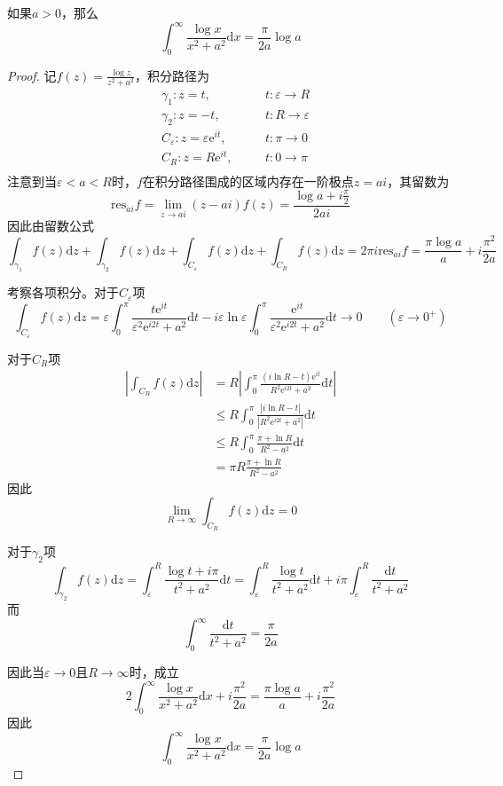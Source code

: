 \documentclass[lang = cn, scheme = chinese, thmcnt = section]{elegantbook}
\begin{document}
\begin{proposition}
	如果$a>0$，那么
	$$
	\int_0^\infty \frac{\log x}{x^2+a^2}\mathrm{d}x=\frac{\pi}{2a}\log a
	$$
\end{proposition}

\begin{proof}
	记$f(z)=\frac{\log z}{z^2+a^2}$​，积分路径为
	\begin{align*}
		&\gamma_1:z=t,\quad &&t:\varepsilon\to R\\
		&\gamma_2:z=-t,\quad &&t:R\to \varepsilon\\
		&C_\varepsilon:z=\varepsilon\mathrm{e}^{it},\quad &&t:\pi\to 0\\
		&C_R:z=R\mathrm{e}^{it},\quad &&t:0\to \pi\\
	\end{align*}
	注意到当$\varepsilon< a <R$时，$f$在积分路径围成的区域内存在一阶极点$z=ai$，其留数为
	$$
	\mathrm{res}_{ai}f=\lim_{z\to ai}(z-ai)f(z)=\frac{\log a+i\frac{\pi}{2}}{2ai}
	$$
	因此由留数公式
	$$
	\int_{\gamma_1}f(z)\mathrm{d}z+\int_{\gamma_2}f(z)\mathrm{d}z+\int_{C_\varepsilon}f(z)\mathrm{d}z+\int_{C_R}f(z)\mathrm{d}z=2\pi i\mathrm{res}_{ai}f=\frac{\pi\log a}{a}+i\frac{\pi^2}{2a}
	$$
	
	考察各项积分。对于$C_\varepsilon$项
	$$
	\int_{C_\varepsilon}f(z)\mathrm{d}z
	=\varepsilon\int_0^\pi\frac{t\mathrm{e}^{it}}{\varepsilon^2\mathrm{e}^{i2t}+a^2}\mathrm{d}t
	-i\varepsilon\ln\varepsilon\int_0^\pi \frac{\mathrm{e}^{it}}{\varepsilon^2\mathrm{e}^{i2t}+a^2}\mathrm{d}t\to0\qquad (\varepsilon\to 0^+)
	$$
	
	对于$C_R$​项
	\begin{align*}
		\left| \int_{C_R}f(z)\mathrm{d}z \right|
		& =R\left| \int_0^\pi \frac{(i\ln R-t)\mathrm{e}^{it}}{R^2\mathrm{e}^{i2t}+a^2}\mathrm{d}t \right|\\
		& \le R\int_0^\pi \frac{|i\ln R-t|}{|R^2\mathrm{e}^{i2t}+a^2|}\mathrm{d}t\\
		& \le R\int_0^\pi\frac{\pi+\ln R}{R^2-a^2}\mathrm{d}t\\
		& =\pi R\frac{\pi+\ln R}{R^2-a^2}
	\end{align*}
	因此%
	$$
	\lim_{R\to\infty}\int_{C_R}f(z)\mathrm{d}z=0
	$$
	
	对于$\gamma_2$项
	$$
	\int_{\gamma_2}f(z)\mathrm{d}z
	=\int_\varepsilon^R\frac{\log t+i\pi}{t^2+a^2}\mathrm{d}t
	=\int_\varepsilon^R\frac{\log t}{t^2+a^2}\mathrm{d}t
	+i\pi\int_\varepsilon^R\frac{\mathrm{d}t}{t^2+a^2}
	$$
	而
	$$
	\int_0^\infty\frac{\mathrm{d}t}{t^2+a^2}=\frac{\pi}{2a}
	$$
	
	因此当$\varepsilon\to0$且$R\to\infty$​时，成立
	$$
	2\int_0^\infty \frac{\log x}{x^2+a^2}\mathrm{d}x+i\frac{\pi^2}{2a}=\frac{\pi\log a}{a}+i\frac{\pi^2}{2a}
	$$
	因此
	$$
	\int_0^\infty \frac{\log x}{x^2+a^2}\mathrm{d}x=\frac{\pi}{2a}\log a
	$$
\end{proof}
\end{document}

